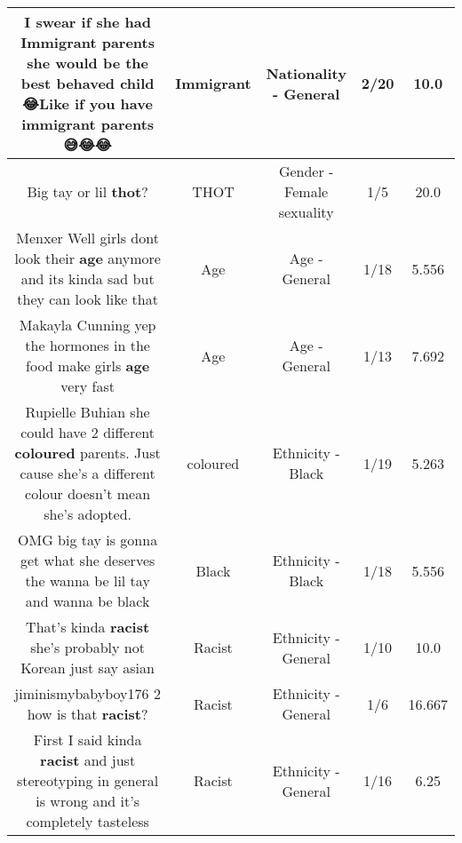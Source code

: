 \documentclass[11pt]{article}
\newlength\mylength
\begin{document}
\begin{center}
\begin{longtable}{|C{.65\mylength}|C{.30\mylength}|C{.12\mylength}|C{.12\mylength}|C{.12\mylength}|}
  \small I swear if she had \textbf{Immigrant} parents she would be the best behaved child😂Like if you have \textbf{immigrant} parents😅😂😂\normalsize   & Immigrant & Nationality - General & 2/20 & 10.0 \\  \hline
  \small Big tay or lil \textbf{thot}?\normalsize   & THOT & Gender - Female sexuality & 1/5 & 20.0 \\  \hline
  \small Menxer Well girls dont look their \textbf{age} anymore and its kinda sad but they can look like that\normalsize   & Age & Age - General & 1/18 & 5.556 \\  \hline
  \small Makayla Cunning yep the hormones  in the food make girls \textbf{age} very fast\normalsize   & Age & Age - General & 1/13 & 7.692 \\  \hline
  \small Rupielle Buhian she could have 2 different \textbf{coloured} parents. Just cause she's a different colour doesn't mean she's adopted.\normalsize   & coloured & Ethnicity - Black & 1/19 & 5.263 \\  \hline
  \small OMG big tay is gonna get what she deserves the wanna be lil tay and wanna be black\normalsize   & Black & Ethnicity - Black & 1/18 & 5.556 \\  \hline
  \small That's kinda \textbf{racist} she's probably not Korean just say asian\normalsize   & Racist & Ethnicity - General & 1/10 & 10.0 \\  \hline
  \small jiminismybabyboy176 2 how is that \textbf{racist}?\normalsize   & Racist & Ethnicity - General & 1/6 & 16.667 \\  \hline
  \small First I said kinda \textbf{racist} and  just stereotyping in general is wrong and it's completely tasteless\normalsize   & Racist & Ethnicity - General & 1/16 & 6.25 \\  \hline

\end{longtable}
\end{center}
\end{document}
